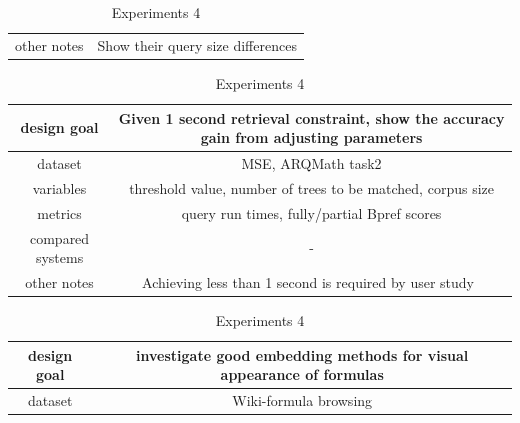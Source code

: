 \documentclass[11pt]{artikel3}
\begin{document}
\begin{table}
\begin{tabular}{c|c}
		\hline

		other notes & Show their query size differences \\

	\end{tabular}



	\vspace{1cm}

	\caption{Experiments 3}

	\begin{tabular}{c|c}

		\hline

		design goal & Given 1 second retrieval constraint, show the accuracy gain from adjusting parameters \\

		\hline

		dataset & MSE, ARQMath task2 \\

	    \hline

		variables & threshold value, number of trees to be matched, corpus size \\

		\hline

		metrics & query run times, fully/partial Bpref scores \\

		\hline

		compared systems & - \\

		\hline

		other notes & Achieving less than 1 second is required by user study~\cite{brutlag2008user} \\

	\end{tabular}



	\vspace{1cm}

	\caption{Experiments 4}

	\begin{tabular}{c|c}

		\hline

		design goal & investigate good embedding methods for visual appearance of formulas \\

		\hline

		dataset & Wiki-formula browsing \\

	    \hline


\end{tabular}
\end{table}
\end{document}
